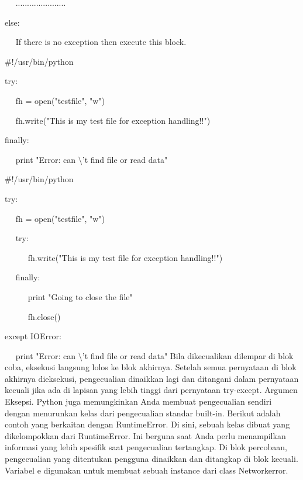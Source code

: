 ~~ ...................... 

else: 
 
~~ If there is no exception then execute this block.  
\vspace{12pt}
\vspace{12pt}
 
 $  \#  $!/usr/bin/python 
\vspace{12pt}

try: 
 
~~ fh = open("testfile", "w") 

~~ fh.write("This is my test file for exception handling!!") 

finally: 

~~ print "Error: can $  \setminus  $'t find file or read data" 
\vspace{12pt}
\vspace{12pt}
 
 $  \#  $!/usr/bin/python 
\vspace{12pt}
 
try: 
 
~~ fh = open("testfile", "w") 

~~ try: 
 
~~~~~ fh.write("This is my test file for exception handling!!") 

~~ finally: 
 
~~~~~ print "Going to close the file" 

~~~~~ fh.close() 

except IOError: 
 
~~ print "Error: can $  \setminus  $'t find file or read data" 
\vspace{12pt}
\vspace{12pt}
\vspace{12pt}
\vspace{12pt}
Bila dikecualikan dilempar di blok coba, eksekusi langsung lolos ke blok akhirnya. Setelah semua pernyataan di blok akhirnya dieksekusi, pengecualian dinaikkan lagi dan ditangani dalam pernyataan kecuali jika ada di lapisan yang lebih tinggi dari pernyataan try-except. Argumen Eksepsi. Python juga memungkinkan Anda membuat pengecualian sendiri dengan menurunkan kelas dari pengecualian standar built-in. Berikut adalah contoh yang berkaitan dengan RuntimeError. Di sini, sebuah kelas dibuat yang dikelompokkan dari RuntimeError. Ini berguna saat Anda perlu menampilkan informasi yang lebih spesifik saat pengecualian tertangkap. Di blok percobaan, pengecualian yang ditentukan pengguna dinaikkan dan ditangkap di blok kecuali. Variabel e digunakan untuk membuat sebuah instance dari class Networkerror. 
\vspace{18pt}

